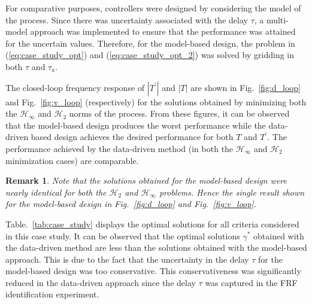 \documentclass[a4paper, 10pt, conference]{ieeeconf}
\newtheorem*{remark}{Remark}
\begin{document}
For comparative purposes, controllers were designed by considering the model of the process.  Since there was uncertainty associated with the delay $\tau$, a multi-model approach was implemented to ensure that the performance was attained for the uncertain values. Therefore, for the model-based design, the problem in (\ref{eq:case_study_opt}) and (\ref{eq:case_study_opt_2}) was solved by gridding in both $\tau$ and $\tau_{a}$.

The closed-loop frequency response of $|T^{\prime}|$ and $|T|$ are shown in Fig.~\ref{fig:d_loop} and Fig.~\ref{fig:v_loop} (respectively) for the solutions obtained by minimizing both the $\mathcal{H}_{\infty}$ and $\mathcal{H}_2$ norms of the process. From these figures, it can be observed that the model-based design produces the worst performance while the data-driven based design achieves the desired performance for both $T$ and $T^{\prime}$. The performance achieved by the data-driven method (in both the $\mathcal{H}_{\infty}$ and $\mathcal{H}_2$ minimization cases) are comparable. 

\begin{remark}
Note that the solutions obtained for the model-based design were nearly identical for both the $\mathcal{H}_2$ and $\mathcal{H}_\infty$ problems. Hence the single result shown for the model-based design in Fig.~\ref{fig:d_loop} and Fig.~\ref{fig:v_loop}. 
\end{remark}

Table.~\ref{tab:case_study} displays the optimal solutions for all criteria considered in this case study. It can be observed that the optimal solutions $\gamma^*$ obtained with the data-driven method are less than the solutions obtained with the model-based approach. This is due to the fact that the uncertainty in the delay $\tau$ for the model-based design was too conservative. This conservativeness was significantly reduced in the data-driven approach since the delay $\tau$ was captured in the FRF identification experiment. 
\end{document}
